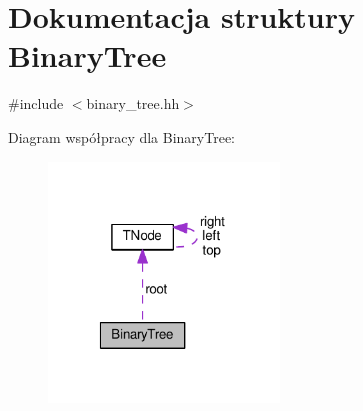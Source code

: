 \hypertarget{struct_binary_tree}{\section{Dokumentacja struktury Binary\-Tree}
\label{struct_binary_tree}
}


{\ttfamily \#include $<$binary\-\_\-tree.\-hh$>$}



Diagram współpracy dla Binary\-Tree\-:
\nopagebreak
\begin{figure}[H]
\begin{center}
\leavevmode
\includegraphics[width=174pt]{struct_binary_tree__coll__graph}
\end{center}
\end{figure}

